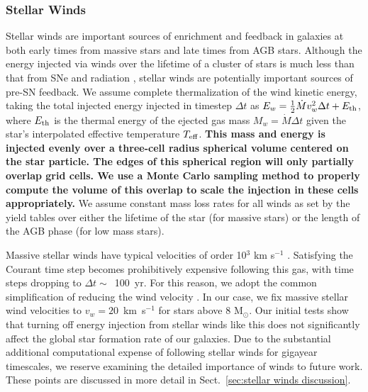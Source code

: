 \documentclass[fleqn,usenatbib,useAMS]{mnras}
\begin{document}
\subsubsection{Stellar Winds}
\label{sec:stellar winds}
Stellar winds are important sources of enrichment and feedback in galaxies at both early times from massive stars and late times from AGB stars. Although the energy injected via winds over the lifetime of a cluster of stars is much less than that from SNe and radiation \citep{Shull1995}, stellar winds are potentially important sources of pre-SN feedback. We assume complete thermalization of the wind kinetic energy, taking the total injected energy injected in timestep $\Delta t$ as $E_w = \frac{1}{2}\dot{M}  v^2_w\Delta t  + E_{\rm th}$, where $E_{\rm th}$ is the thermal energy of the ejected gas mass $M_w = \dot{M}\Delta t$ given the star's interpolated effective temperature $T_{\rm eff}$. \textbf{This mass and energy is injected evenly over a three-cell radius spherical volume centered on the star particle. The edges of this spherical region will only partially overlap grid cells. We use a Monte Carlo sampling method to properly compute the volume of this overlap to scale the injection in these cells appropriately.} We assume constant mass loss rates for all winds as set by the yield tables over either the lifetime of the star (for massive stars) or the length of the AGB phase (for low mass stars). 

Massive stellar winds have typical velocities of order 10$^{3}$ km s$^{-1}$ \citep{Leitherer1992}. Satisfying the Courant time step becomes prohibitively expensive following this gas, with time steps dropping to $\Delta t \sim$~100~yr. For this reason, we adopt the common simplification of reducing the wind velocity \citep[e.g][]{Offner2015}. In our case, we fix massive stellar wind velocities to $v_w = 20$~km~s$^{-1}$ for stars above 8 M$_{\odot}$. Our initial tests show that turning off energy injection from stellar winds like this does not significantly affect the global star formation rate of our galaxies. Due to the substantial additional computational expense of following stellar winds for gigayear timescales, we reserve examining the detailed importance of winds to future work. These points are discussed in more detail in Sect.~\ref{sec:stellar winds discussion}.
\end{document}
